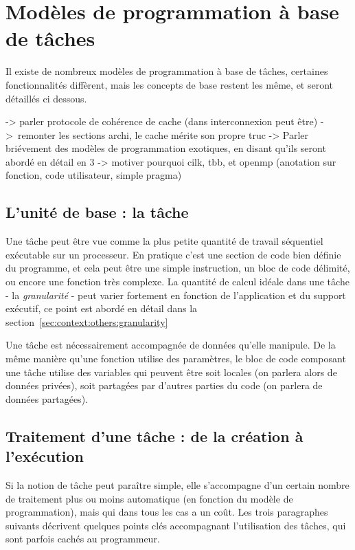 \section{Modèles de programmation à base de tâches}\label{sec:context:others}

Il existe de nombreux modèles de programmation à base de tâches, certaines fonctionnalités diffèrent, mais les concepts de base restent les même, et seront détaillés ci dessous.

\begin{todo}

  -> parler protocole de cohérence de cache (dans interconnexion peut être)
  -> remonter les sections archi, le cache mérite son propre truc
  -> Parler briévement des modèles de programmation exotiques, en disant qu'ils seront abordé en détail en 3
  -> motiver pourquoi cilk, tbb, et openmp (anotation sur fonction, code utilisateur, simple pragma)
\end{todo}

\subsection{L'unité de base : la tâche}

Une tâche peut être vue comme la plus petite quantité de travail séquentiel exécutable sur un processeur.
En pratique c'est une section de code bien définie du programme, et cela peut être une simple instruction, un bloc de code délimité, ou encore une fonction très complexe.
La quantité de calcul idéale dans une tâche - la \emph{granularité} - peut varier fortement en fonction de l'application et du support exécutif, ce point est abordé en détail dans la section~\ref{sec:context:others:granularity}

Une tâche est nécessairement accompagnée de données qu'elle manipule. De la même manière qu'une fonction utilise des paramètres, le bloc de code composant une tâche utilise des variables qui peuvent être soit locales (on parlera alors de données privées), soit partagées par d'autres parties du code (on parlera de données partagées).


\subsection{Traitement d'une tâche : de la création à l'exécution}\label{sec:context:others:costs}

Si la notion de tâche peut paraître simple, elle s'accompagne d'un certain nombre de traitement plus ou moins automatique (en fonction du modèle de programmation), mais qui dans tous les cas a un coût.
Les trois paragraphes suivants décrivent quelques points clés accompagnant l'utilisation des tâches, qui sont parfois cachés au programmeur.

